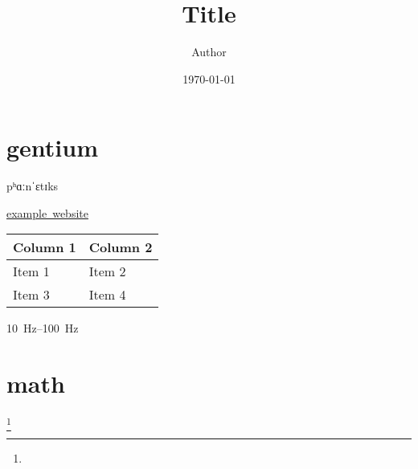 \documentclass[twoside, 10pt]{article}
\title{Title}
\author{Author}
\date{\today}
\begin{document}
    \maketitle
    \tableofcontents

    \section{gentium}
    \label{sec1}
    {\gentium pʰɑːnˈɛtɪks}
    
    \href{www.example.com}{example\ website}

    \begin{tabu} to .8\textwidth {X[2,l]X[1,r]}
        Column 1 & Column 2 \\
        \hline
        Item 1 & Item 2 \\
        Item 3 & Item 4 \\
    \end{tabu}

    \SIrange{10}{100}{\hertz}

    \section{math}      \label{sec2}
        \footnote{}
\end{document}
